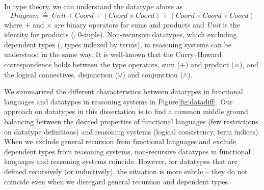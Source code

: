 In type theory, we can understand the datatype above as
\[ \textit{Diagram} ~ \triangleq ~
        \textit{Unit} + \textit{Coord} + (\textit{Coord} \times \textit{Coord})
        + (\textit{Coord} \times \textit{Coord} \times \textit{Coord}) \]
where $+$ and $\times$ are binary operators for sums and products
and \textit{Unit} is the identity for products (\ie, 0-tuple).
Non-recursive datatypes, which excluding dependent types (\ie, types indexed by terms), 
in reasoning systems can be understood in the same way. It is well-known
that the Curry--Howard correspondence holds between the type operators,
sum ($+$) and product ($\times$), and the logical connectives,
disjunction ($\lor$) and conjunction ($\land$).

We summarized the different characteristics between datatypes
in functional languages and datatypes in reasoning systems
in Figure\;\ref{fig:datadiff}. Our approach on datatypes
in this dissertation is to find a common middle ground
balancing between the desired properties of functional languages
(few restrictions on datatype definitions) and reasoning systems
(logical consistency, term indices). When we exclude general recursion
from functional languages and exclude dependent types from reasoning systems,
non-recursive datatypes in functional languages and reasoning systems coincide.
However, for datatypes that are defined recursively (or inductively), the situation
is more subtle -- they do not coincide even when we disregard general recursion
and dependent types.


